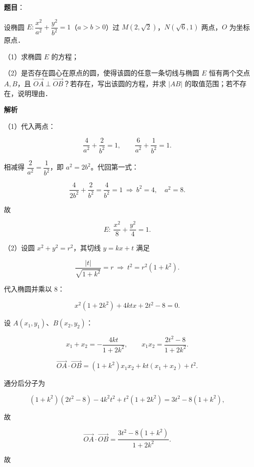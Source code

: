 \begin{answer}

\textbf{题目}：

设椭圆 $E:\dfrac{x^2}{a^2}+\dfrac{y^2}{b^2}=1$（$a>b>0$）过 $M(2,\sqrt2)$，$N(\sqrt6,1)$ 两点，$O$ 为坐标原点．

（1）求椭圆 $E$ 的方程；

（2）是否存在圆心在原点的圆，使得该圆的任意一条切线与椭圆 $E$ 恒有两个交点 $A,B$，且 $\overrightarrow{OA}\perp\overrightarrow{OB}$？若存在，写出该圆的方程，并求 $|AB|$ 的取值范围；若不存在，说明理由．

\textbf{解析}

（1）代入两点：

\nopagebreak[4]
\[\frac{4}{a^2}+\frac{2}{b^2}=1,\qquad \frac{6}{a^2}+\frac{1}{b^2}=1 .\]

相减得 $\dfrac{2}{a^2}=\dfrac{1}{b^2}$，即 $a^2=2b^2$。代回第一式：

\nopagebreak[4]
\[\frac{4}{2b^2}+\frac{2}{b^2}=\frac{4}{b^2}=1\ \Longrightarrow\ b^2=4,\quad a^2=8 .\]

故

\nopagebreak[4]
\[E:\ \frac{x^2}{8}+\frac{y^2}{4}=1 .\]

（2）设圆 $x^2+y^2=r^2$，其切线 $y=kx+t$ 满足

\nopagebreak[4]
\[\frac{|t|}{\sqrt{1+k^2}}=r\ \Longrightarrow\ t^2=r^2(1+k^2).\]

代入椭圆并乘以 $8$：

\nopagebreak[4]
\[x^2(1+2k^2)+4ktx+2t^2-8=0 .\]

设 $A(x_1,y_1)$、$B(x_2,y_2)$：

\nopagebreak[4]
\[x_1+x_2=-\frac{4kt}{1+2k^2},\qquad x_1x_2=\frac{2t^2-8}{1+2k^2}.\]

\nopagebreak[4]
\[\overrightarrow{OA}\cdot\overrightarrow{OB}
=(1+k^2)x_1x_2+kt(x_1+x_2)+t^2 .\]

通分后分子为

\nopagebreak[4]
\[(1+k^2)(2t^2-8)-4k^2t^2+t^2(1+2k^2)=3t^2-8(1+k^2),\]

故

\nopagebreak[4]
\[\overrightarrow{OA}\cdot\overrightarrow{OB}=\frac{3t^2-8(1+k^2)}{1+2k^2}.\]

故


\end{answer}
